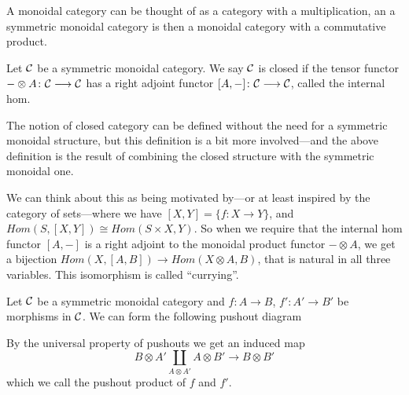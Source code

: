 A monoidal category can be thought of as a category with a multiplication, an a symmetric monoidal category is then a monoidal category with a commutative product. 

\begin{definition}
Let $\mathcal{C}$ be a symmetric monoidal category. We say $\mathcal{C}$ is closed if the tensor functor $-\otimes A\colon \mathcal{C} \longrightarrow \mathcal{C}$ has a right adjoint functor $[A, -]\colon \mathcal{C} \longrightarrow \mathcal{C}$, called the internal hom. 
\end{definition}

The notion of closed category can be defined without the need for a symmetric monoidal structure, but this definition is a bit more involved---and the above definition is the result of combining the closed structure with the symmetric monoidal one. 

We can think about this as being motivated by---or at least inspired by the category of sets---where we have $[X,Y]=\{ f:X\rightarrow Y\}$, and $Hom(S, [X, Y])\cong Hom(S\times X, Y)$. So when we require that the internal hom functor $[A,-]$ is a right adjoint to the monoidal product functor $-\otimes A$, we get a bijection $Hom(X, [A, B])\rightarrow Hom(X\otimes A, B)$, that is natural in all three variables. This isomorphism is called ``currying''.

\begin{definition}
Let $\mathcal{C}$ be a symmetric monoidal category and $f\colon A\to B$, $f'\colon A'\to B'$ be morphisms in $\mathcal{C}$. We can form the following pushout diagram
\begin{center}
\end{center}
By the universal property of pushouts we get an induced map
\begin{equation*}
    B\otimes A' \coprod_{A\otimes A'} A\otimes B' \longrightarrow B\otimes B'
\end{equation*}
which we call the pushout product of $f$ and $f'$. 
\end{definition}

